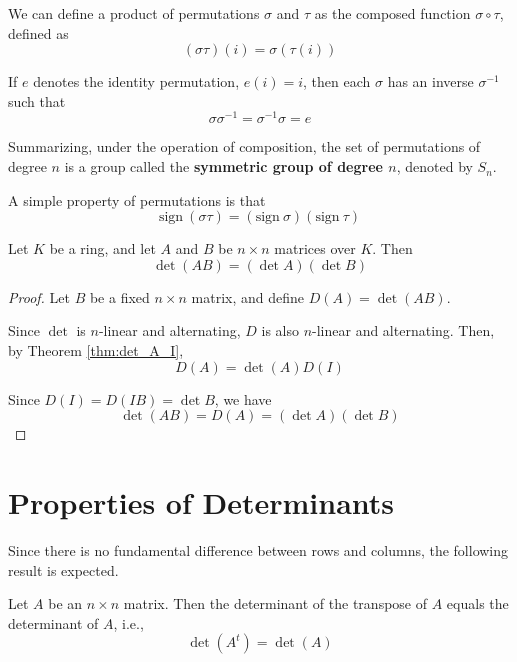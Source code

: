 \begin{remark}
	We can define a product of permutations $\sigma$ and $\tau$ as the composed function $\sigma \circ \tau$, defined as
	\[
		(\sigma \tau)(i) = \sigma(\tau(i))
	\]
	
	If $e$ denotes the identity permutation, $e(i) = i$, then each $\sigma$ has an inverse $\sigma^{-1}$ such that
	\[
		\sigma \sigma^{-1} = \sigma^{-1} \sigma = e
	\]
	
	Summarizing, under the operation of composition, the set of permutations of degree $n$ is a group called the \textbf{symmetric group of degree $n$}, denoted by $S_n$.
	
	A simple property of permutations is that
	\[
		\text{sign} ~(\sigma \tau) = (\text{sign} ~\sigma)(\text{sign} ~\tau)
	\]
\end{remark}

\begin{theorem}
	Let $K$ be a ring, and let $A$ and $B$ be $n \times n$ matrices over $K$. Then
	\[
		\det(AB) = (\det A)(\det B)
	\]
\end{theorem}

\begin{proof}
	Let $B$ be a fixed $n \times n$ matrix, and define $D(A) = \det(AB)$.
	
	Since $\det$ is $n$-linear and alternating, $D$ is also $n$-linear and alternating. Then, by Theorem \ref{thm:det_A_I},
	\[
		D(A) = \det(A) D(I)
	\]
	
	Since $D(I) = D(IB) = \det B$, we have
	\[
		\det(AB) = D(A) = (\det A)(\det B)
	\]
\end{proof}

\section{Properties of Determinants}

Since there is no fundamental difference between rows and columns, the following result is expected.

\begin{theorem}
	Let $A$ be an $n \times n$ matrix. Then the determinant of the transpose of $A$ equals the determinant of $A$, i.e., 
	\[
		\det(A^t) = \det (A)
	\]
\end{theorem}

